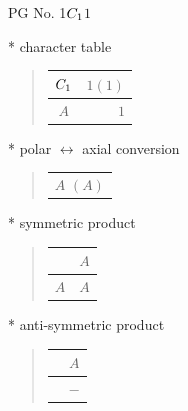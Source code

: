 \documentclass[fleqn,8pt,landscape]{jsarticle}
\begin{document}
\setcounter{MaxMatrixCols}{32}

\renewcommand{\tablename}{Table~}
\renewcommand{\figurename}{Figure~}
\begin{center}
\LARGE
PG No. 1\quad$C_{\rm 1}$\quad$1$\quad[ triclinic ]
\end{center}

* character table
\begin{quote}
\begin{tabular}{cr} \hline \hline
$ C_{\rm 1} $ & $ 1(1) $ \\ \hline
$ A $ & $ 1 $ \\
 \hline \hline
\end{tabular}
\end{quote}

* polar $\leftrightarrow$ axial conversion
\begin{quote}
\begin{tabular}{c}
$ A\,\,(A) $
\end{tabular}
\end{quote}

* symmetric product
\begin{quote}
\begin{tabular}{c|c} \hline \hline
 & $ A $ \\ \hline
$ A $ & $ A $ \\
 \hline \hline
\end{tabular}
\end{quote}

* anti-symmetric product
\begin{quote}
\begin{tabular}{cc} \hline \hline
 & $ A $ \\ \hline
$  $ & $ - $ \\
 \hline \hline
\end{tabular}
\end{quote}
\end{document}
